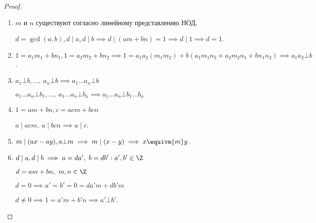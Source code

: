 \begin{proof}
    \begin{enumerate}
        \item $m$ и $n$ существуют согласно линейному представлению НОД.
        
        $d = \gcd(a, b), d \mid a, d \mid b \implies d \mid (am + bn) = 1 \implies d \mid 1 \implies d = 1$.
        
        \item $1 = a_1m_1 + bn_1, 1 = a_2m_2 + bn_2 \implies 1 = a_1a_2(m_1m_2) + b(a_1m_1n_2 + a_2m_2n_1+bn_1n_2) \implies a_1a_2 \bot b$.
        
        \item $a_1 \bot b, \ldots,~a_n \bot b \implies a_1 \ldots a_n \bot b$
        
        $a_1 \ldots a_n \bot b_1, \ldots,~a_1 \ldots a_n \bot b_n \implies a_1 \ldots a_n \bot b_1 \ldots b_n$
        
        \item $1 = am + bn, c = acm + bcn$
        
        $a \mid acm,~a \mid bcn \implies a \mid c$.
        
        \item $m \mid (ax - ay), a \bot m \implies m \mid (x - y) \implies x \equivm{m} y$.
        
        \item $d \mid a, d \mid b \implies a = da',~b=db': a', b' \in \Z$
        
        $d = am + bn,~m, n \in \Z$
        
        $d = 0 \implies a' = b' = 0 = da'm + db'm$
        
        $d \neq 0 \implies 1 = a'm + b'n \implies a' \bot b'$.
    \end{enumerate}
\end{proof}
